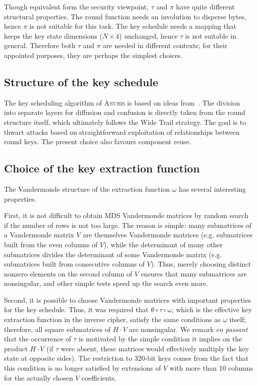 \documentclass{llncs}
\begin{document}
Though equivalent form the security viewpoint, $\tau$ and $\pi$
have quite different structural properties. The round function
needs an involution to disperse bytes, hence $\pi$ is not
suitable for this task. The key schedule needs a mapping that
keeps the key state dimensions ($N \times 4$) unchanged, hence
$\tau$ is not suitable in general. Therefore both $\tau$ and
$\pi$ are needed in different contexts; for their appointed
purposes, they are perhaps the simplest choices.

\subsection{Structure of the key schedule}

The key scheduling algorithm of \textsc{Anubis} is based on ideas
from~\cite{vincent}. The division into separate layers for
diffusion and confusion is directly taken from the round
structure itself, which ultimately follows the Wide Trail
strategy. The goal is to thwart attacks based on straightforward
exploitation of relationships between round keys. The present
choice also favours component reuse.

\subsection{Choice of the key extraction function}

The Vandermonde structure of the extraction function $\omega$ has
several interesting properties.

First, it is not difficult to obtain MDS Vandermonde matrices by
random search if the number of rows is not too large. The reason
is simple: many submatrices of a Vandermonde matrix $V$ are
themselves Vandermonde matrices (e.g. submatrices built from the
even columns of $V$), while the determinant of many other
submatrices divides the determinant of some Vandermonde matrix
(e.g. submatrices built from consecutive columns of $V$).  Thus,
merely choosing distinct nonzero elements on the second column of
$V$ ensures that many submatrices are nonsingular, and other
simple tests speed up the search even more.

Second, it is possible to choose Vandermonde matrices with
important properties for the key schedule. Thus, it was required
that $\theta \circ \tau \circ \omega$, which is the effective key
extraction function in the inverse cipher, satisfy the same
conditions as $\omega$ itself; therefore, all square submatrices
of $H \cdot V$ are nonsingular. We remark \emph{en passant} that
the occurrence of $\tau$ is motivated by the simple condition it
implies on the product $H \cdot V$ (if $\tau$ were absent, these
matrices would effectively multiply the key state at opposite
sides). The restriction to 320-bit keys comes from the fact that
this condition is no longer satisfied by extensions of $V$ with
more than 10 columns for the actually chosen $V$ coefficients.
\end{document}
